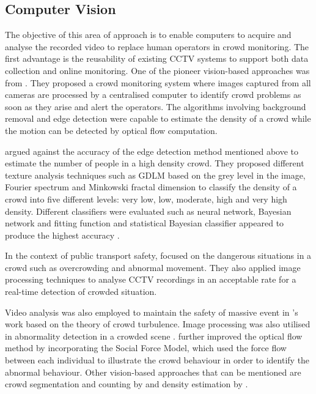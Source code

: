 \subsection{Computer Vision}
The objective of this area of approach is to enable computers to acquire and analyse the recorded video to replace human operators in crowd monitoring. The first advantage is the reusability of existing CCTV systems to support both data collection and online monitoring. One of the pioneer vision-based approaches was from \citet{Davies1995}. They proposed a crowd monitoring system where images captured from all cameras are processed by a centralised computer to identify crowd problems as soon as they arise and alert the operators. The algorithms involving background removal and edge detection were capable to estimate the density of a crowd while the motion can be detected by optical flow computation.

\citet{Marana1997} argued against the accuracy of the edge detection method mentioned above to estimate the number of people in a high density crowd. They proposed different texture analysis techniques such as GDLM based on the grey level in the image, Fourier spectrum and Minkowski fractal dimension \citep{Marana1999} to classify the density of a crowd into five different levels: very low, low, moderate, high and very high density. Different classifiers were evaluated such as neural network, Bayesian network and fitting function and statistical Bayesian classifier appeared to produce the highest accuracy \citep{Marana1998}.

In the context of public transport safety, \citet{Velastin1999} focused on the dangerous situations in a crowd such as overcrowding and abnormal movement. They also applied image processing techniques to analyse CCTV recordings in an acceptable rate for a real-time detection of crowded situation.

Video analysis was also employed to maintain the safety of massive event in \citet{Johansson2008}’s work based on the theory of crowd turbulence. Image processing was also utilised in abnormality detection in a crowded scene \citep{Mahadevan2010, Mehran2009}. \citet{Mehran2009} further improved the optical flow method by incorporating the Social Force Model, which used the force flow between each individual to illustrate the crowd behaviour in order to identify the abnormal behaviour. Other vision-based approaches that can be mentioned are crowd segmentation and counting by \citet{Chan2008} and density estimation by \citet{Li2010}.

